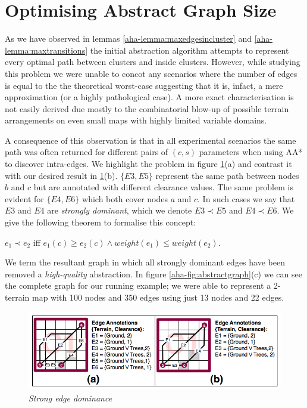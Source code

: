 \section{Optimising Abstract Graph Size}
\par \indent
As we have observed in lemmas \ref{aha-lemma:maxedgesincluster} and \ref{aha-lemma:maxtransitions} the initial abstraction algorithm attempts to represent every optimal path between clusters and inside clusters. However, while studying this problem we were unable to concot any scenarios where the number of edges is equal to the the theoretical worst-case suggesting that it is, infact, a mere approximation (or a highly pathological case).  A more exact characterisation is not easily derived due mostly to the combinatorial blow-up of possible terrain arrangements on even small maps with highly limited variable domains.
\par \indent 
A consequence of this observation is that in all experimental scenarios the same path was often returned for different pairs of $(c, s)$ parameters when using AA* to discover intra-edges. We highlight the problem in figure \ref{aha-fig:strongdominance}(a) and contrast it with our desired result in \ref{aha-fig:strongdominance}(b). $\lbrace E3, E5 \rbrace$ represent the same path between nodes $b$ and $c$ but are annotated with different clearance values. The same problem is evident for $\lbrace E4, E6 \rbrace$ which both cover nodes $a$ and $c$. In such cases we say that $E3$ and $E4$ are \emph{strongly dominant}, which we denote $E3 \prec E5$ and $E4 \prec E6$. We give the following theorem to formalise this concept:

\begin{theorem}
\label{aha-theorem:strongdominance}
$e_{1} \prec e_{2}$ iff  $e_{1}(c) \geq e_{2}(c) \wedge weight(e_{1}) \leq weight(e_{2})$.
\end{theorem}

We term the resultant graph in which all strongly dominant edges have been removed a \emph{high-quality} abstraction. In figure \ref{aha-fig:abstractgraph}(c) we can see the complete graph for our running example; we were able to represent a 2-terrain map with 100 nodes and 350 edges using just 13 nodes and  22 edges. 

\begin{figure}[htbp]
        \caption{\emph{Strong edge dominance} }
        \begin{center}
                        \includegraphics[scale=0.3]{diagrams/intraedges_initial.png}
        \end{center}
        \label{aha-fig:strongdominance}
\end{figure}

